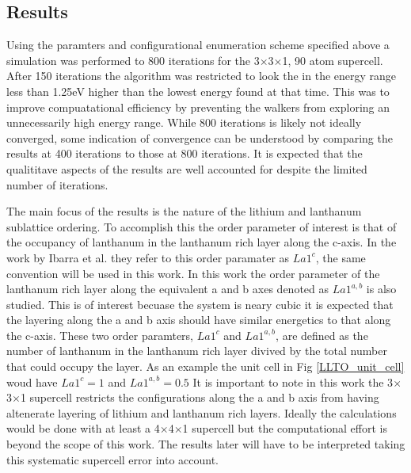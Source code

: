 \documentclass[aps,prl,reprint,superscriptaddress,showkeys]{revtex4-1}
\begin{document}
\subsection{Results}
  Using the paramters and configurational enumeration scheme specified above a simulation was performed to 800 iterations for  the 3$\times$3$\times$1,  90 atom supercell. After 150 iterations the algorithm was restricted to look the in the energy range less than 1.25eV higher than the lowest energy found at that time. This was to improve compuatational efficiency by preventing the walkers from exploring an unnecessarily high energy range. While 800 iterations is likely not ideally converged, some indication of convergence can be understood by comparing the results at 400 iterations to those at 800 iterations. It is expected that the qualititave aspects of the results are well accounted for despite the limited number of iterations. 
  
  The main focus of the results is the nature of the lithium and lanthanum sublattice ordering. To accomplish this the order parameter of interest is that of the occupancy of lanthanum in the lanthanum rich layer along the c-axis.  In the work by Ibarra et al. \cite{P4mmmstrucuture} they refer to this order paramater as $La1^c$, the same convention will be used in this work. In this work the order parameter of the lanthanum rich layer along the equivalent a and b axes denoted as $La1^{a,b}$ is also studied. This is of interest becuase the system is neary cubic it is expected that the layering along the a and b axis should have similar energetics to that along the c-axis. These two order paramters, $La1^c$ and $La1^{a,b}$, are defined as the number of lanthanum in the lanthanum rich layer divived by the total number that could occupy the layer. As an example the unit cell in Fig \ref{LLTO_unit_cell} woud have $La1^c=1$ and $La1^{a,b}=0.5$  It is important to note in this work the 3$\times$3$\times$1 supercell restricts the configurations along the a and b axis from having altenerate layering of lithium and lanthanum rich layers. Ideally the calculations would be done with at least a 4$\times$4$\times$1 supercell but the computational effort is beyond the scope of this work. The results later will have to be interpreted taking this systematic supercell error into account.  
  
\end{document}
